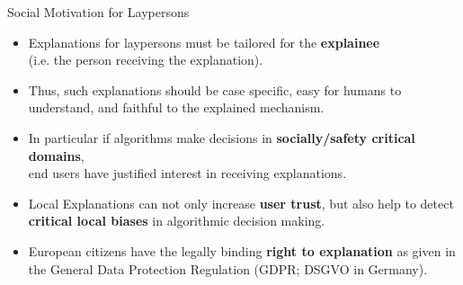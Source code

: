 \documentclass[aspectratio=169]{../latex_main/tntbeamer}  %
\begin{document}
\begin{frame}{Social Motivation for Laypersons}

	\begin{itemize}
		\item Explanations for laypersons must be tailored for the \textbf{explainee}\\ (i.e. the person receiving the explanation).
		\pause\smallskip
		\item Thus, such explanations should be case specific, easy for humans to understand, and faithful to the explained mechanism.
		\pause\smallskip
		\item In particular if algorithms make decisions in \textbf{socially/safety critical domains},\\ end users have justified interest in receiving explanations.
		\pause\smallskip
		\item Local Explanations can not only increase \textbf{user trust}, but also help to detect \textbf{critical local biases} in algorithmic decision making.
		\pause\smallskip
		\item European citizens have the legally binding \textbf{right to explanation} as given in the General Data Protection Regulation (GDPR; DSGVO in Germany).

	\end{itemize}
\end{frame}


\end{document}
